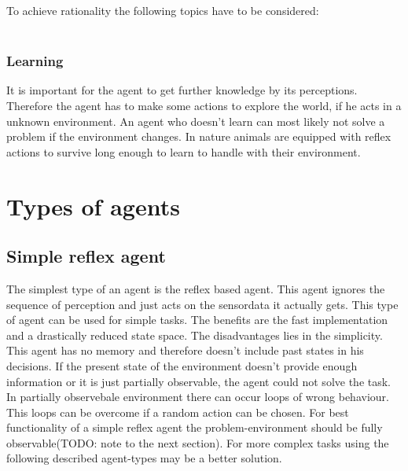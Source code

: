 \documentclass[10pt,a4paper,DIV=11]{scrreprt}
\begin{document}
To achieve rationality the following topics have to be considered: \\

   \\

\subsubsection{Learning}
It is important for the agent to get further knowledge by its perceptions. Therefore the agent has to make some actions to explore the world, if he acts in a unknown environment.
An agent who doesn't learn can most likely not solve a problem if the environment changes.
In nature animals are equipped with reflex actions to survive long enough to learn to handle with their environment.

\section{Types of agents}

\subsection{Simple reflex agent}
The simplest type of an agent is the reflex based agent.
This agent ignores the sequence of perception and just acts on the sensordata it actually gets. This type of agent can be used for simple tasks. The benefits are the fast implementation and a drastically reduced state space.
The disadvantages lies in the simplicity. This agent has no memory and therefore doesn't include past states in his decisions. If the present state of the environment doesn't provide enough information or it is just partially observable, the agent could not solve the task.
In partially observebale environment there can occur loops of wrong behaviour. This loops can be overcome if a random action can be chosen.
For best functionality of a simple reflex agent the problem-environment should be fully observable(TODO: note to the next section).
For more complex tasks using the following described agent-types may be a better solution.
\end{document}
